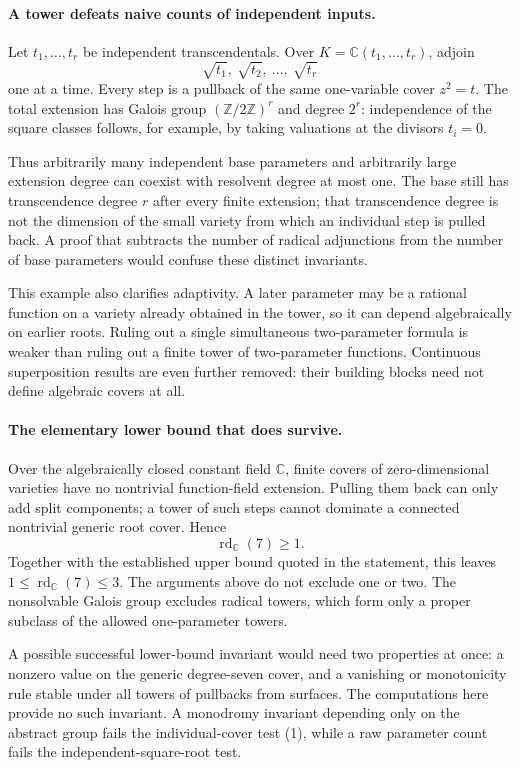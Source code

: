 \documentclass[11pt]{article}
\begin{document}
\paragraph{A tower defeats naive counts of independent inputs.}
Let $t_1,\ldots,t_r$ be independent transcendentals. Over $K=\mathbb C(t_1,\ldots,t_r)$, adjoin
\[
 \sqrt{t_1},\ \sqrt{t_2},\ \ldots,\ \sqrt{t_r}
\]
one at a time. Every step is a pullback of the same one-variable cover $z^2=t$. The total extension has Galois group $(\mathbb Z/2\mathbb Z)^r$ and degree $2^r$: independence of the square classes follows, for example, by taking valuations at the divisors $t_i=0$.

Thus arbitrarily many independent base parameters and arbitrarily large extension degree can coexist with resolvent degree at most one. The base still has transcendence degree $r$ after every finite extension; that transcendence degree is not the dimension of the small variety from which an individual step is pulled back. A proof that subtracts the number of radical adjunctions from the number of base parameters would confuse these distinct invariants.

This example also clarifies adaptivity. A later parameter may be a rational function on a variety already obtained in the tower, so it can depend algebraically on earlier roots. Ruling out a single simultaneous two-parameter formula is weaker than ruling out a finite tower of two-parameter functions. Continuous superposition results are even further removed: their building blocks need not define algebraic covers at all.

\paragraph{The elementary lower bound that does survive.}
Over the algebraically closed constant field $\mathbb C$, finite covers of zero-dimensional varieties have no nontrivial function-field extension. Pulling them back can only add split components; a tower of such steps cannot dominate a connected nontrivial generic root cover. Hence
\[
 \operatorname{rd}_{\mathbb C}(7)\ge1.
\]
Together with the established upper bound quoted in the statement, this leaves $1\le\operatorname{rd}_{\mathbb C}(7)\le3$. The arguments above do not exclude one or two. The nonsolvable Galois group excludes radical towers, which form only a proper subclass of the allowed one-parameter towers.

A possible successful lower-bound invariant would need two properties at once: a nonzero value on the generic degree-seven cover, and a vanishing or monotonicity rule stable under all towers of pullbacks from surfaces. The computations here provide no such invariant. A monodromy invariant depending only on the abstract group fails the individual-cover test (1), while a raw parameter count fails the independent-square-root test.
\end{document}
